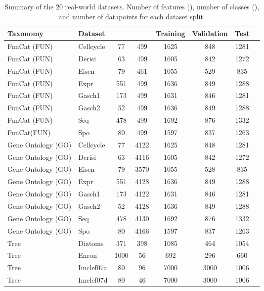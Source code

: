 \documentclass{article}
\begin{document}
\begin{table}[t]
    \centering
    \footnotesize
        \caption{Summary of the 20 real-world datasets. Number of features (), number of classes (), and number of datapoints for each dataset split.}
    \begin{tabular}{l l c c c c c c}
    \toprule
         {\sc Taxonomy} & {\sc Dataset} &  &  & {\sc Training} & {\sc Validation} & {\sc Test}  \\
    \midrule
         {\sc FunCat (FUN)} & {\sc Cellcycle} & 77 & 499 & 1625 & 848 & 1281 \\
         {\sc FunCat (FUN)} & {\sc Derisi} & 63 & 499 &  1605 & 842 & 1272 \\
         {\sc FunCat (FUN)} & {\sc Eisen} & 79 & 461 &  1055 & 529 & 835 \\
         {\sc FunCat (FUN)} & {\sc Expr} & 551 & 499 &  1636 & 849 & 1288 \\
         {\sc FunCat (FUN)} & {\sc Gasch1} & 173 & 499 &  1631 & 846 & 1281 \\
         {\sc FunCat (FUN)} & {\sc Gasch2} & 52 & 499 &  1636 & 849 & 1288 \\
         {\sc FunCat (FUN)} & {\sc Seq} & 478 & 499 & 1692 & 876 & 1332 \\
         {\sc FunCat(FUN)} & {\sc Spo} & 80 & 499 & 1597 & 837 & 1263 \\
    \midrule   
    {\sc Gene Ontology (GO)} & {\sc Cellcycle} & 77 & 4122 & 1625 & 848 & 1281 \\
     {\sc Gene Ontology (GO)} & {\sc Derisi} & 63 & 4116 & 1605 & 842 & 1272 \\
     {\sc Gene Ontology (GO)} & {\sc Eisen} & 79 & 3570 & 1055 & 528 & 835 \\
     {\sc Gene Ontology (GO)} & {\sc Expr} & 551 & 4128 & 1636 & 849 & 1288 \\
     {\sc Gene Ontology (GO)} & {\sc Gasch1} & 173 & 4122 & 1631 & 846 & 1281 \\
     {\sc Gene Ontology (GO)} & {\sc Gasch2} & 52 & 4128 & 1636 & 849 & 1288 \\
     {\sc Gene Ontology (GO)} & {\sc Seq} & 478 & 4130 & 1692 & 876 & 1332 \\
     {\sc Gene Ontology (GO)} & {\sc Spo} & 80 & 4166 & 1597 & 837 & 1263 \\
     \midrule
     {\sc Tree} & {\sc Diatoms} & 371 & 398 & 1085 & 464 & 1054 \\
    {\sc Tree} & {\sc Enron} & 1000 & 56 & 692 & 296 & 660 \\
     {\sc Tree} & {\sc Imclef07a} & 80 & 96 & 7000 & 3000 & 1006 \\
     {\sc Tree} & {\sc Imclef07d} & 80 & 46 & 7000 & 3000 & 1006 \\
    \bottomrule
    \end{tabular}
    \label{tab:datasets}
\end{table}
\end{document}
